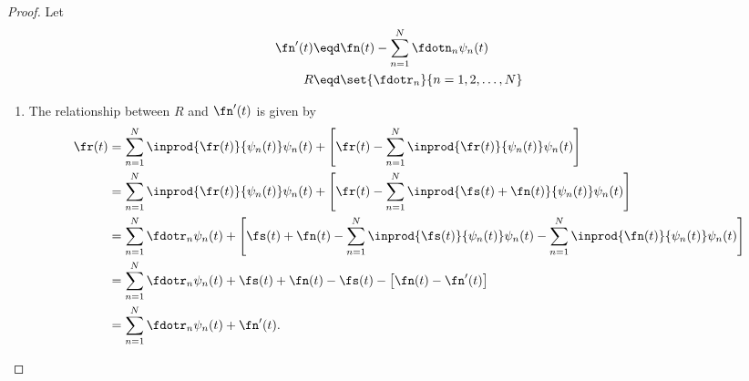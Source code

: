 \begin{proof}
Let
\begin{align*}
  \fn'(t) &\eqd \fn(t) - \sum_{n=1}^N \fdotn_n \psi_n(t) \\
  R       &\eqd \set{\fdotr_n}{n=1,2,\ldots,N}
\end{align*}

\begin{enumerate}
\item The relationship between $R$ and $\fn'(t)$ is given by
\begin{align*}
   \fr(t)
     &= \sum_{n=1}^N \inprod{\fr(t)}{\psi_n(t)}\psi_n(t) +
        \left[\fr(t)- \sum_{n=1}^N \inprod{\fr(t)}{\psi_n(t)}\psi_n(t) \right]
   \\&= \sum_{n=1}^N \inprod{\fr(t)}{\psi_n(t)}\psi_n(t) +
        \left[\fr(t)- \sum_{n=1}^N \inprod{\fs(t)+\fn(t)}{\psi_n(t)}\psi_n(t) \right]
   \\&= \sum_{n=1}^N \fdotr_n\psi_n(t) +
        \left[\fs(t)+\fn(t) - \sum_{n=1}^N \inprod{\fs(t)}{\psi_n(t)}\psi_n(t)
                        - \sum_{n=1}^N \inprod{\fn(t)}{\psi_n(t)}\psi_n(t) \right]
   \\&= \sum_{n=1}^N \fdotr_n\psi_n(t) +
        \fs(t)+\fn(t) - \fs(t) - \left[ \fn(t) - \fn'(t)\right]
   \\&= \sum_{n=1}^N \fdotr_n\psi_n(t) + \fn'(t).
\end{align*}


\end{enumerate}
\end{proof}
